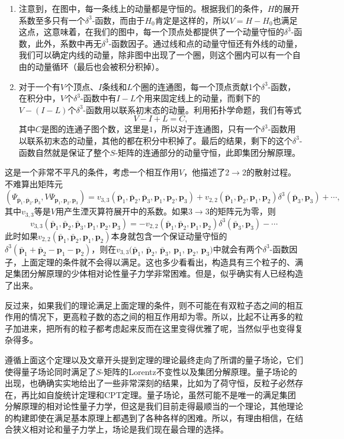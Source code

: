 \documentclass[11pt]{article}
\theoremstyle{definition}
\theoremstyle{plain}
\begin{document}
\begin{enumerate}
\item 注意到，在图中，每一条线上的动量都是守恒的。根据我们的条件，$H$的展开系数至多只有一个$\delta^3$-函数，而由于$H_0$肯定是这样的，所以$V=H-H_0$也满足这点，这意味着，在我们的图中，每一个顶点处都提供了一个动量守恒的$\delta^3$-函数，此外，系数中再无$\delta^3$-函数因子。通过线和点的动量守恒还有外线的动量，我们可以确定内线的动量，除非图中出现了一个圈，则这个圈内可以有一个自由的动量循环（最后也会被积分积掉）。

\item 对于一个有$V$个顶点、$I$条线和$L$个圈的连通图，每一个顶点贡献1个$\delta^3$-函数，在积分中，$V$个$\delta^3$-函数中有$I-L$个用来固定线上的动量，而剩下的$V-(I-L)$个$\delta^3$-函数用以联系初末态的动量。利用拓扑学命题，我们有等式
\[
	V-I+L=C,
\]
其中$C$是图的连通子图个数，这里是$1$，所以对于连通图，只有一个$\delta^3$-函数用以联系初末态的动量，其他的都在积分中积掉了。最后的结果，剩下的这个$\delta^3$-函数自然就是保证了整个$S$-矩阵的连通部分的动量守恒，此即集团分解原理。
\end{enumerate}


这是一个非常不平凡的条件，考虑一个相互作用$V$，他描述了$2\to 2$的散射过程。不难算出矩阵元
\[
	(\Psi_{\bar{\bm{p}}_1,\bar{\bm{p}}_2,\bar{\bm{p}}_3},V\Psi_{\bm{p}_1,\bm{p}_2,\bm{p}_3})=v_{3,3}(\bar{\bm{p}}_1,\bar{\bm{p}}_2,\bar{\bm{p}}_3,\bm{p}_1,\bm{p}_2,\bm{p}_3)+v_{2,2}(\bar{\bm{p}}_1,\bar{\bm{p}}_2,\bm{p}_1,\bm{p}_2)\delta^{3}(\bar{\bm{p}}_3,\bm{p}_3)+\cdots,
\]
其中$v_{3,3}$等是$V$用产生湮灭算符展开中的系数。如果$3\to 3$的矩阵元为零，则
\[
	v_{3,3}(\bar{\bm{p}}_1,\bar{\bm{p}}_2,\bar{\bm{p}}_3,\bm{p}_1,\bm{p}_2,\bm{p}_3)=-v_{2,2}(\bar{\bm{p}}_1,\bar{\bm{p}}_2,\bm{p}_1,\bm{p}_2)\delta^{3}(\bar{\bm{p}}_3,\bm{p}_3)-\cdots
\]
此时如果$v_{2,2}(\bar{\bm{p}}_1,\bar{\bm{p}}_2,\bm{p}_1,\bm{p}_2)$本身就包含一个保证动量守恒的$\delta^3(\bar{\bm{p}}_1+\bar{\bm{p}}_2-\bm{p}_1-\bm{p}_2)$，则在$v_{3,3}(\bar{\bm{p}}_1$, $\bar{\bm{p}}_2$, $\bar{\bm{p}}_3$, $\bm{p}_1$, $\bm{p}_2$, $\bm{p}_3)$中就会有两个$\delta^3$-函数因子，上面定理的条件就不会得以满足。这也多少看看出，构造具有三个粒子的、满足集团分解原理的少体相对论性量子力学非常困难。但是，似乎确实有人已经构造了出来。

反过来，如果我们的理论满足上面定理的条件，则不可能在有双粒子态之间的相互作用的情况下，更高粒子数的态之间的相互作用却为零。所以，比起不让再多的粒子加进来，把所有的粒子都考虑起来反而在这里变得优雅了呢，当然似乎也变得复杂得多。

遵循上面这个定理以及文章开头提到定理的理论最终走向了所谓的量子场论，它们使得量子场论同时满足了$S$-矩阵的Lorentz不变性以及集团分解原理。量子场论的出现，也确确实实地给出了一些非常深刻的结果，比如为了荷守恒，反粒子必然存在，再比如自旋统计定理和CPT定理。量子场论，虽然可能不是唯一的满足集团分解原理的相对论性量子力学，但这是我们目前走得最顺当的一个理论，其他理论的构建即使在满足基本原理上都遇到了各种各样的困难。所以，有理由相信，在结合狭义相对论和量子力学上，场论是我们现在最合理的选择。
\end{document}
